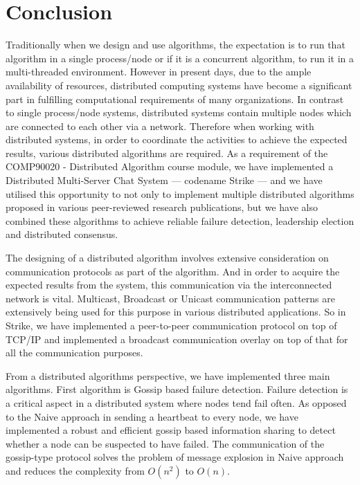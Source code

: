 \documentclass[dareport.tex]{subfiles}
\begin{document}
\section{Conclusion}

Traditionally when we design and use algorithms, the expectation is to run that algorithm in a single process/node or if it is a concurrent algorithm, to run it in a multi-threaded environment. However in present days, due to the ample availability of resources, distributed computing systems have become a significant part in fulfilling computational requirements of many organizations. In contrast to single process/node systems, distributed systems contain multiple nodes which are connected to each other via a network. Therefore when working with distributed systems, in order to coordinate the activities to achieve the expected results, various distributed algorithms are required. As a requirement of the COMP90020 - Distributed Algorithm course module, we have implemented a Distributed Multi-Server Chat System --- codename Strike --- and we have utilised this opportunity to not only to implement multiple distributed algorithms proposed in various peer-reviewed research publications, but we have also combined these algorithms to achieve reliable failure detection, leadership election and distributed consensus.

The designing of a distributed algorithm involves extensive consideration on communication protocols as part of the algorithm. And in order to acquire the expected results from the system, this communication via the interconnected network is vital. Multicast, Broadcast or Unicast communication patterns are extensively being used for this purpose in various distributed applications. So in Strike, we have implemented a peer-to-peer communication protocol on top of TCP/IP and implemented a broadcast communication overlay on top of that for all the communication purposes.

From a distributed algorithms perspective, we have implemented three main algorithms. First algorithm is Gossip based failure detection. Failure detection is a critical aspect in a distributed system where nodes tend fail often. As opposed to the Naive approach in sending a heartbeat to every node, we have implemented a robust and efficient gossip based information sharing to detect whether a node can be suspected to have failed. The communication of the gossip-type protocol solves the problem of message explosion in Naive approach and reduces the complexity from $ O(n^2) $ to $ O(n) $.
\end{document}
